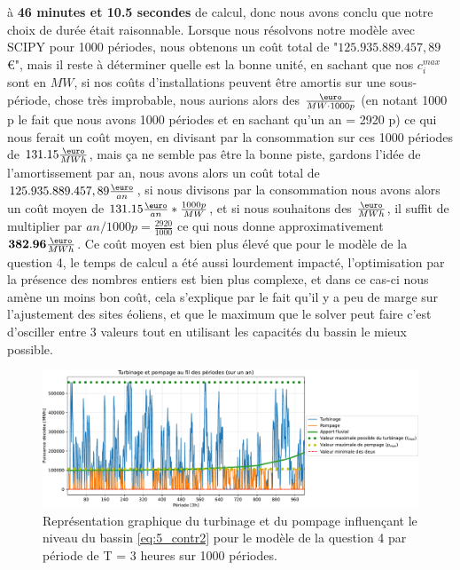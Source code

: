 \documentclass{article}
\begin{document}
à \textbf{46 minutes et 10.5 secondes} de calcul, donc nous avons conclu que notre choix de durée était raisonnable.
Lorsque nous résolvons notre modèle avec SCIPY pour 1000 périodes, nous obtenons un coût total de "$125.935.889.457,89$ \euro", mais il reste
à déterminer quelle est la bonne unité, en sachant que nos $c_i^{max}$ sont en $MW$, si nos coûts d'installations peuvent être amortis sur une sous-période, chose très improbable, nous aurions
alors des $\frac{\text{\euro}}{MW \cdot 1000 p}$ (en notant 1000 p le fait que nous avons 1000 périodes et en sachant 
qu'un an = 2920 p)
ce qui nous ferait un coût moyen, en divisant par la consommation sur ces 1000 périodes 
de $131.15 \frac{\text{\euro}}{MWh}$, mais ça ne semble pas être la bonne piste, gardons l'idée de l'amortissement par an, 
nous avons alors un coût total de $125.935.889.457,89 \frac{\text{\euro}}{an}$, si nous divisons par la consommation 
nous avons alors un coût moyen de $131.15 \frac{\text{\euro}}{an}*\frac{1000 p}{ MW}$, 
et si nous souhaitons des $\frac{\text{\euro}}{MWh}$, il suffit 
de multiplier par $an/ 1000 p  = \frac{2920}{1000}$ ce qui nous donne approximativement $\mathbf{382.96} \frac{\text{\euro}}{MWh}$.
Ce coût moyen est bien plus élevé que pour le modèle de la question 4, le temps de calcul a été aussi lourdement impacté, l'optimisation
par la présence des nombres entiers est bien plus complexe, et dans ce cas-ci nous amène un moins bon coût, cela s'explique par le fait qu'il
y a peu de marge sur l'ajustement des sites éoliens, et que le maximum que le solver peut faire c'est d'osciller entre 3 valeurs tout en utilisant
les capacités du bassin le mieux possible.

\begin{figure}[H]
    \centering
    \includegraphics[scale=0.6]{GraphesP2/Turbinage_pompage_Q5.pdf}
    \caption{Représentation graphique du turbinage et du pompage
    influençant le niveau du bassin \eqref{eq:5_contr2} pour le modèle de la question 4 par période de T = 3 heures sur 1000 périodes.}
    \label{fig:Turbinage_pompage_Q5}
\end{figure}
\end{document}
